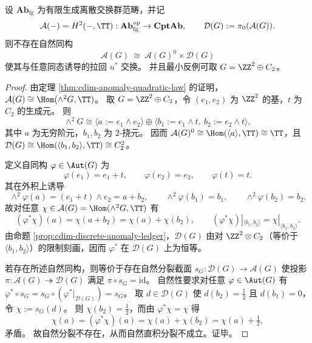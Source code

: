 \begin{theorem}[异常正则形的函子性分裂不成立]\label{conj:cdim-anomaly-functorial-splitting}
设 \(\mathbf{Ab}_{\mathrm{fg}}\) 为有限生成离散交换群范畴，并记
\[
\mathcal A(-)=H^2(-,\TT):\mathbf{Ab}_{\mathrm{fg}}^{\mathrm{op}}\to\mathbf{CptAb},
\qquad
\mathcal D(G):=\pi_0(\mathcal A(G)).
\]
则不存在自然同构
\[
\mathcal A(G)\ \cong\ \mathcal A(G)^0\times \mathcal D(G)
\]
使其与任意同态诱导的拉回 \(u^\ast\) 交换。
并且最小反例可取
\(
G=\ZZ^2\oplus C_2
\)。
\end{theorem}
\begin{proof}
由定理 \ref{thm:cdim-anomaly-quadratic-law} 的证明，\(\mathcal A(G)\cong \Hom(\wedge^2G,\TT)\)。
取
\(
G=\ZZ^2\oplus C_2
\)，令 \((e_1,e_2)\) 为 \(\ZZ^2\) 的基，\(t\) 为 \(C_2\) 的生成元。
则
\[
\wedge^2G\cong
\langle a:=e_1\wedge e_2\rangle
\oplus
\langle b_1:=e_1\wedge t,\ b_2:=e_2\wedge t\rangle,
\]
其中 \(a\) 为无穷阶元，\(b_1,b_2\) 为 \(2\)-挠元。
因而
\(
\mathcal A(G)^0\cong \Hom(\langle a\rangle,\TT)\cong \TT
\)，且
\(
\mathcal D(G)\cong \Hom(\langle b_1,b_2\rangle,\TT)\cong C_2^2
\)。

定义自同构 \(\varphi\in\Aut(G)\) 为
\[
\varphi(e_1)=e_1+t,\qquad
\varphi(e_2)=e_2,\qquad
\varphi(t)=t.
\]
其在外积上诱导
\[
\wedge^2\varphi(a)=(e_1+t)\wedge e_2=a+b_2,
\qquad
\wedge^2\varphi(b_1)=b_1,\qquad
\wedge^2\varphi(b_2)=b_2.
\]
故对任意 \(\chi\in\mathcal A(G)=\Hom(\wedge^2G,\TT)\) 有
\[
(\varphi^\ast\chi)(a)=\chi(a+b_2)=\chi(a)+\chi(b_2),
\qquad
(\varphi^\ast\chi)|_{\langle b_1,b_2\rangle}=\chi|_{\langle b_1,b_2\rangle}.
\]
由命题 \ref{prop:cdim-discrete-anomaly-ledger}，\(\mathcal D(G)\) 由对 \(\ZZ^2\otimes C_2\)（等价于 \(\langle b_1,b_2\rangle\)）的限制刻画，因而 \(\varphi^\ast\) 在 \(\mathcal D(G)\) 上为恒等。

若存在所述自然同构，则等价于存在自然分裂截面
\(
s_G:\mathcal D(G)\to\mathcal A(G)
\)
使投影 \(\pi:\mathcal A(G)\twoheadrightarrow\mathcal D(G)\) 满足 \(\pi\circ s_G=\mathrm{id}\)。
自然性要求对任意 \(\varphi\in\Aut(G)\) 有
\(
\varphi^\ast\circ s_G=s_G\circ (\varphi^\ast|_{\mathcal D(G)})=s_G
\)。
取 \(d\in\mathcal D(G)\) 使 \(d(b_2)=\tfrac12\) 且 \(d(b_1)=0\)，令 \(\chi:=s_G(d)\)。
则 \(\chi(b_2)=\tfrac12\)，而由 \(\varphi^\ast\chi=\chi\) 得
\[
\chi(a)=(\varphi^\ast\chi)(a)=\chi(a)+\chi(b_2)=\chi(a)+\tfrac12,
\]
矛盾。
故自然分裂不存在，从而自然直积分裂不成立。证毕。
\end{proof}

